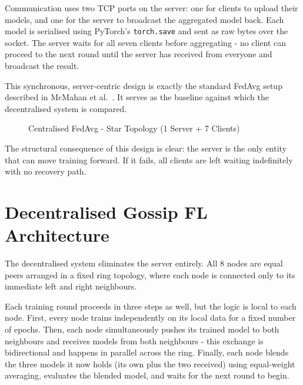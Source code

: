 \documentclass[12pt]{report}
\begin{document}
Communication uses two TCP ports on the server: one for clients to upload their
models, and one for the server to broadcast the aggregated model back. Each model
is serialised using PyTorch's \texttt{torch.save} and sent as raw bytes over the
socket. The server waits for all seven clients before aggregating - no client
can proceed to the next round until the server has received from everyone and
broadcast the result.

This synchronous, server-centric design is exactly the standard FedAvg setup
described in McMahan et al.~\cite{mcmahan2017}. It serves as the baseline against
which the decentralised system is compared.

\begin{figure}[ht]
\centering
{}
\caption{Centralised FedAvg - Star Topology (1 Server + 7 Clients)}
\label{fig:centralised-arch}
\end{figure}

The structural consequence of this design is clear: the server is the only entity
that can move training forward. If it fails, all clients are left waiting
indefinitely with no recovery path.

\section{Decentralised Gossip FL Architecture}

The decentralised system eliminates the server entirely. All 8 nodes are equal
peers arranged in a fixed ring topology, where each node is connected only to its
immediate left and right neighbours.

Each training round proceeds in three steps as well, but the logic is local to
each node. First, every node trains independently on its local data for a fixed
number of epochs. Then, each node simultaneously pushes its trained model to both
neighbours and receives models from both neighbours - this exchange is
bidirectional and happens in parallel across the ring. Finally, each node blends
the three models it now holds (its own plus the two received) using equal-weight
averaging, evaluates the blended model, and waits for the next round to begin.
\end{document}
